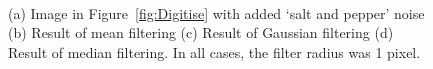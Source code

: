 \begin{figure}[t]
	\centering
	\hspace{1cm}
	\\
	\hspace{1cm}
  \caption{(a) Image in Figure~\ref{fig:Digitise} with added \lq{}salt and pepper' noise (b) Result of mean filtering (c) Result of Gaussian filtering (d) Result of median filtering. In all cases, the filter radius was 1 pixel.}
  \label{fig:HighFreqNoise}
\end{figure}

